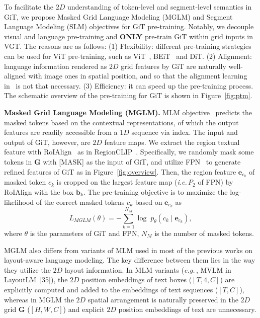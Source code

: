 \documentclass[10pt,twocolumn,letterpaper]{article}
\def\eg{\emph{e.g.}\,}
\def\ie{\emph{i.e.}\,}
\begin{document}
To facilitate the $2D$ understanding of token-level and segment-level semantics in GiT,
we propose Masked Grid Language Modeling (MGLM) and Segment Language Modeling (SLM) objectives for GiT pre-training.
Notably, we decouple visual and language pre-training and \textbf{ONLY} pre-train GiT within grid inputs in VGT.
The reasons are as follows:
(1) Flexibility: different pre-training strategies can be used for ViT pre-training, such as ViT~\cite{vit}, BEiT~\cite{bao2021beit} and DiT\cite{li2022dit}.
(2) Alignment: language information rendered as $2D$ grid features by GiT are naturally well-aligned with image ones in spatial position, and so that the alignment learning in~\cite{xu2020layoutlmv2,huang2022layoutlmv3} is not that necessary.
(3) Efficiency: it can speed up the pre-training process.
The schematic overview of the pre-training for GiT is shown in Figure~\ref{fig:ptm}.


\noindent
\textbf{Masked Grid Language Modeling (MGLM).}
MLM objective~\cite{devlin2018bert} predicts the masked tokens based on the contextual representations, 
of which the output features are readily accessible from a $1D$ sequence via index.
The input and output of GiT, however, are $2D$ feature maps.
We extract the region textual feature with RoIAlign~\cite{maskrcnn} as in RegionCLIP~\cite{regionclip}.
Specifically, we randomly mask some tokens in $\mathbf{G} $ with [MASK] as the input of GiT,
and utilize FPN~\cite{FPN} to generate refined features of GiT as in Figure~\ref{fig:overview}.
Then, the region feature $\mathbf{e}_{c_k}$ of masked token $c_k$
is cropped on the largest feature map (\ie $P_2$ of FPN) by RoIAlign with the box $\mathbf{b}_k$.
The pre-training objective is to maximize the log-likelihood of the correct masked tokens $c_k$ 
based on  $\mathbf{e}_{c_k}$ as
\begin{equation}
L_{MGLM} (\theta) = -\sum_{k=1}^{N_M} \log \; p_{\theta}( c_k \; | \; \mathbf{e}_{c_k} ),
\end{equation}
where $\theta$ is the parameters of GiT and FPN, $N_M$ is the number of masked tokens.

MGLM also differs from variants of MLM used in most of the previous works on layout-aware language modeling.
The key difference between them lies in the way they utilize the $2D$ layout information. In MLM variants (\eg, MVLM in LayoutLM~[35]), the $2D$ position embeddings of text boxes ($[T, 4, C]$) are explicitly computed and added to the embeddings of text sequences ($[T, C]$), whereas in MGLM the $2D$ spatial arrangement is naturally preserved in the $2D$ grid $\mathbf{G}$ ($[H,W,C]$) and explicit $2D$ position embeddings of text are unnecessary.
\end{document}
